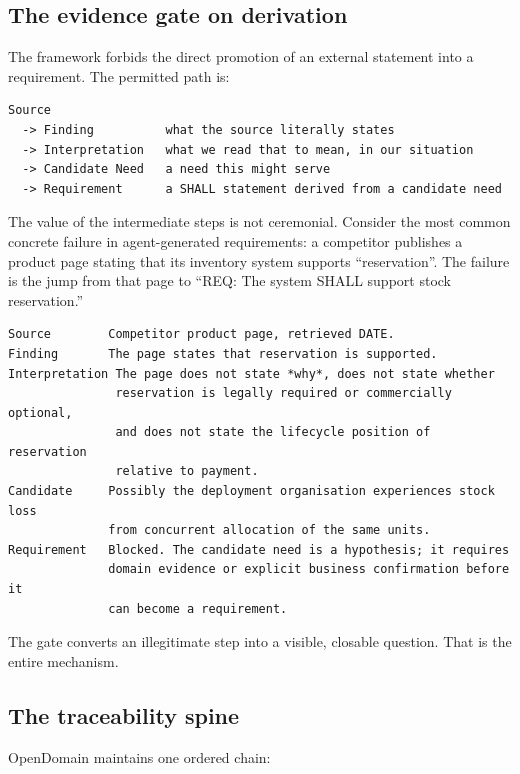 \documentclass[11pt,a4paper]{article}
\begin{document}
\subsection{The evidence gate on derivation}

The framework forbids the direct promotion of an external statement into a requirement. The permitted path is:

\begin{Verbatim}[fontsize=\footnotesize,breaklines=true,breakanywhere=true,breakautoindent=false,samepage=false]
Source
  -> Finding          what the source literally states
  -> Interpretation   what we read that to mean, in our situation
  -> Candidate Need   a need this might serve
  -> Requirement      a SHALL statement derived from a candidate need
\end{Verbatim}

The value of the intermediate steps is not ceremonial. Consider the most common concrete failure in agent-generated requirements: a competitor publishes a product page stating that its inventory system supports ``reservation''. The failure is the jump from that page to ``REQ: The system SHALL support stock reservation.''

\begin{Verbatim}[fontsize=\footnotesize,breaklines=true,breakanywhere=true,breakautoindent=false,samepage=false]
Source        Competitor product page, retrieved DATE.
Finding       The page states that reservation is supported.
Interpretation The page does not state *why*, does not state whether
               reservation is legally required or commercially optional,
               and does not state the lifecycle position of reservation
               relative to payment.
Candidate     Possibly the deployment organisation experiences stock loss
              from concurrent allocation of the same units.
Requirement   Blocked. The candidate need is a hypothesis; it requires
              domain evidence or explicit business confirmation before it
              can become a requirement.
\end{Verbatim}

The gate converts an illegitimate step into a visible, closable question. That is the entire mechanism.

\subsection{The traceability spine}

OpenDomain maintains one ordered chain:
\end{document}
